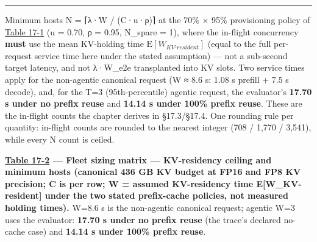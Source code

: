 \begin{center}\rule{0.5\linewidth}{0.5pt}\end{center}

Minimum hosts N = ⌈λ·W / (C·u·ρ)⌉ at the 70\% × 95\% provisioning policy
of \hyperref[tab:17.1]{Table 17-1} (u = 0.70, ρ = 0.95, N\_spare = 1), where the in-flight
concurrency \textbf{must} use the mean KV-holding time
\(\mathrm{E}[W_{KV\text{-}resident}]\) (equal to the full per-request
service time here under the stated assumption) --- not a sub-second
target latency, and not λ·W\_e2e transplanted into KV slots. Two service
times apply for the non-agentic canonical request (W ≈ 8.6 s: 1.08 s
prefill + 7.5 s decode), and, for the T=3 (95th-percentile) agentic
request, the evaluator's \textbf{17.70 s under no prefix reuse} and
\textbf{14.14 s under 100\% prefix reuse}. These are the in-flight
counts the chapter derives in §17.3/§17.4. One rounding rule per
quantity: in-flight counts are rounded to the nearest integer (708 /
1,770 / 3,541), while every N count is ceiled.

\textbf{\hyperref[tab:17.2]{Table 17-2} --- Fleet sizing matrix --- KV-residency ceiling and
minimum hosts (canonical 436 GB KV budget at FP16 and FP8 KV precision;
C is per row; W = assumed KV-residency time E{[}W\_KV-resident{]} under
the two stated prefix-cache policies, not measured holding times).}
W=8.6 s is the non-agentic canonical request; agentic W=3 uses the
evaluator: \textbf{17.70 s under no prefix reuse} (the trace's declared
no-cache case) and \textbf{14.14 s under 100\% prefix reuse}.

